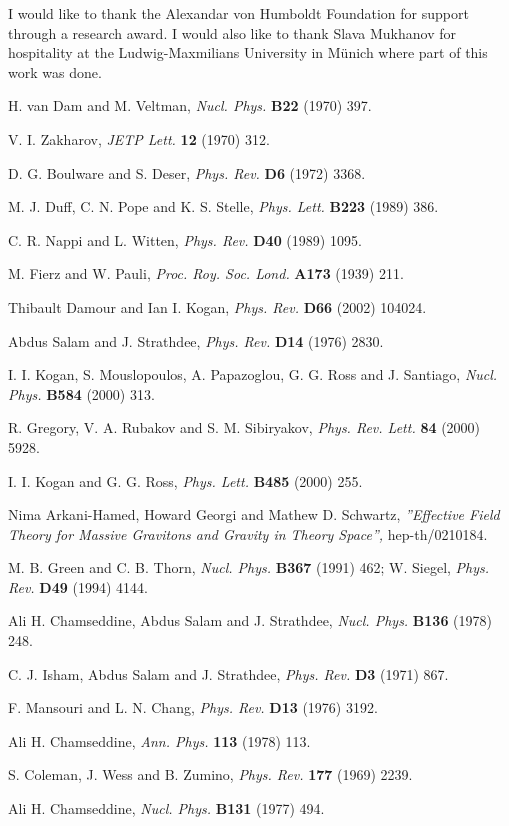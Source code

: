 \documentclass[a4paper,12pt]{article}
\begin{document}
I would like to thank the Alexandar von Humboldt Foundation for support
through a research award. I would also like to thank Slava Mukhanov for
hospitality at the Ludwig-Maxmilians University in M\"{u}nich where part of
this work was done.

\begin{thebibliography}{99}
H. van Dam and M. Veltman, \textit{Nucl. Phys. }\textbf{B22}
(1970) 397.

V. I. Zakharov, \textit{JETP Lett. }\textbf{12 }(1970) 312.

D. G. Boulware and S. Deser, \textit{Phys. Rev. }\textbf{D6
}(1972) 3368.

M. J. Duff, C. N. Pope and K. S. Stelle, \textit{Phys. Lett.
}\textbf{B223 }(1989) 386.

C. R. Nappi and L. Witten, \textit{Phys. Rev. }\textbf{D40 }(1989) 1095.

M. Fierz and W. Pauli, \textit{Proc. Roy. Soc. Lond. }\textbf{A173
}(1939) 211.

Thibault Damour and Ian I. Kogan, \textit{Phys. Rev. }\textbf{D66
}(2002) 104024.

Abdus Salam and J. Strathdee, \textit{Phys. Rev. }\textbf{D14
}(1976) 2830.

I. I. Kogan, S. Mouslopoulos, A. Papazoglou, G. G. Ross and J.
Santiago, \textit{Nucl. Phys. }\textbf{B584 }(2000) 313.

R. Gregory, V. A. Rubakov and S. M. Sibiryakov, \textit{Phys.
Rev. Lett. }\textbf{84 }(2000) 5928.

I. I. Kogan and G. G. Ross, \textit{Phys. Lett. }\textbf{B485
}(2000) 255.

Nima Arkani-Hamed, Howard Georgi and Mathew D. Schwartz,
\textit{''Effective Field Theory for Massive Gravitons and Gravity in Theory
Space'', }hep-th/0210184.

M. B. Green and C. B. Thorn, \textit{Nucl. Phys. }\textbf{B367
}(1991) 462; W. Siegel, \textit{Phys. Rev. }\textbf{D49 }(1994) 4144.

Ali H. Chamseddine, Abdus Salam and J. Strathdee, \textit{Nucl.
Phys. }\textbf{B136 }(1978) 248.

C. J. Isham, Abdus Salam and J. Strathdee, \textit{Phys. Rev.
}\textbf{D3 }(1971) 867.

F. Mansouri and L. N. Chang, \textit{Phys. Rev. }\textbf{D13
}(1976) 3192.

Ali H. Chamseddine, \textit{Ann. Phys. }\textbf{113 }(1978) 113.

S. Coleman, J. Wess and B. Zumino, \textit{Phys. Rev. }\textbf{177
}(1969) 2239.

Ali H. Chamseddine, \textit{Nucl. Phys. }\textbf{B131 }(1977) 494.
\end{thebibliography}
\end{document}
